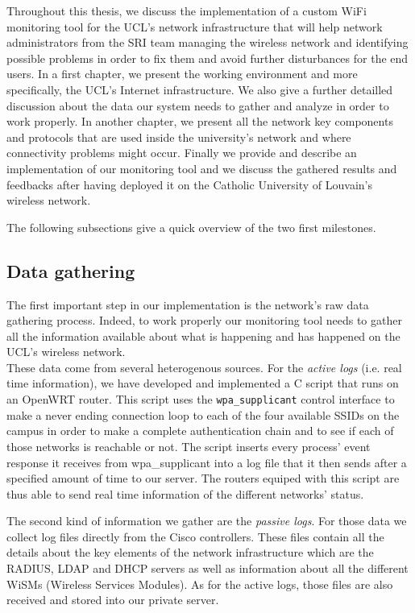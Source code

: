 Throughout this thesis, we discuss the implementation of a custom WiFi monitoring tool for the UCL's network infrastructure that will help network administrators from the SRI team managing the wireless network and identifying possible problems in order to fix them and avoid further disturbances for the end users. In a first chapter, we present the working environment and more specifically, the UCL's Internet infrastructure. We also give a further detailled discussion about the data our system needs to gather and analyze in order to work properly. In another chapter, we present all the network key components and protocols that are used inside the university's network and where connectivity problems might occur. Finally we provide and describe an implementation of our monitoring tool and we discuss the gathered results and feedbacks after having deployed it on the Catholic University of Louvain's wireless network.

The following subsections give a quick overview of the two first milestones.


\subsection{Data gathering}
The first important step in our implementation is the network's raw data gathering process. Indeed, to work properly our monitoring tool needs to gather all the information available about what is happening and has happened on the UCL's wireless network.\\
These data come from several heterogenous sources. For the \textit{active logs} (i.e. real time information), we have developed and implemented a C script that runs on an OpenWRT router. This script uses the \texttt{wpa\_supplicant} control interface to make a never ending connection loop to each of the four available SSIDs on the campus in order to make a complete authentication chain and to see if each of those networks is reachable or not. The script inserts every process' event response it receives from wpa\_supplicant into a log file that it then sends after a specified amount of time to our server. The routers equiped with this script are thus able to send real time information of the different networks' status.

The second kind of information we gather are the \textit{passive logs}. For those data we collect log files directly from the Cisco controllers. These files contain all the details about the key elements of the network infrastructure which are the RADIUS, LDAP and DHCP servers as well as information about all the different WiSMs (Wireless Services Modules). As for the active logs, those files are also received and stored into our private server.



